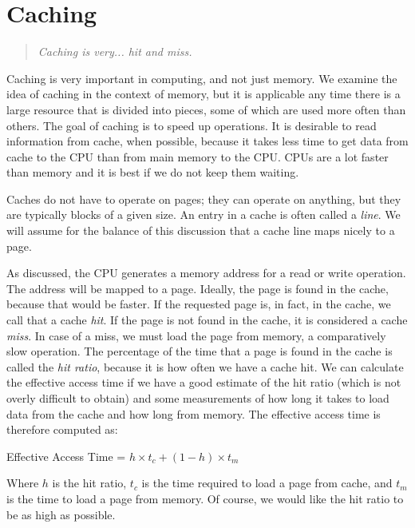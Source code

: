 




\section*{Caching}
\begin{quote}
\textit{Caching is very... hit and miss.}
\end{quote}


Caching is very important in computing, and not just memory. We examine the idea of caching in the context of memory, but it is applicable any time there is a large resource that is divided into pieces, some of which are used more often than others. The goal of caching is to speed up operations. It is desirable to read information from cache, when possible, because it takes less time to get data from cache to the CPU than from main memory to the CPU. CPUs are a lot faster than memory and it is best if we do not keep them waiting.

Caches do not have to operate on pages; they can operate on anything, but they are typically blocks of a given size. An entry in a cache is often called a \textit{line}. We will assume for the balance of this discussion that a cache line maps nicely to a page.

As discussed, the CPU generates a memory address for a read or write operation. The address will be mapped to a page. Ideally, the page is found in the cache, because that would be faster. If the requested page is, in fact,  in the cache, we call that a cache \textit{hit}. If the page is not found in the cache, it is considered a cache \textit{miss}. In case of a miss, we must load the page from memory, a comparatively slow operation. The percentage of the time that a page is found in the cache is called the \textit{hit ratio}, because it is how often we have a cache hit. We can calculate the effective access time if we have a good estimate of the hit ratio (which is not overly difficult to obtain) and some measurements of how long it takes to load data from the cache and how long from memory. The effective access time is therefore computed as:

\begin{center}
Effective Access Time = $h \times t_{c} + (1-h) \times t_{m}$
\end{center}

Where $h$ is the hit ratio, $t_{c}$ is the time required to load a page from cache, and $t_{m}$ is the time to load a page from memory. Of course, we would like the hit ratio to be as high as possible. 

